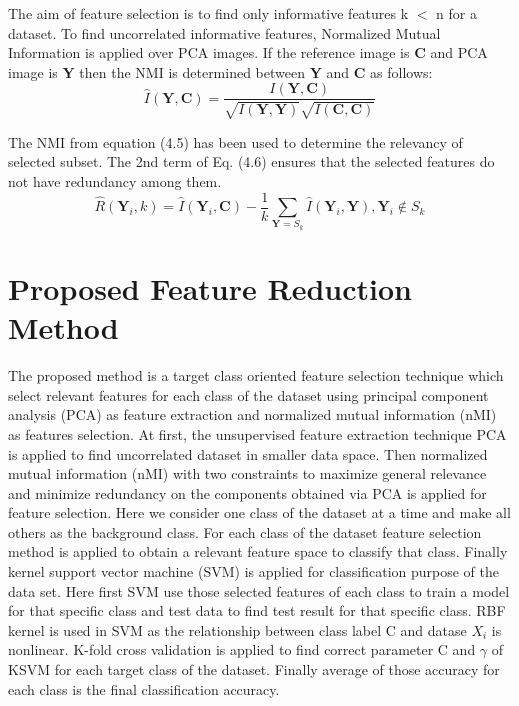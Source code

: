 \documentclass[document.tex]{subfiles}
\begin{document}
\noindent The aim of feature selection is to find only informative features
k $<$ n for a dataset. To find uncorrelated informative features, Normalized
Mutual Information is applied over PCA images. If the reference image is \textbf{C} and PCA image is \textbf{Y} then the NMI is determined between \textbf{Y} and \textbf{C} as follows:
\begin{equation}
\hat{I}(\textbf{Y},\textbf{C}) = \dfrac{I(\textbf{Y}, \textbf{C})}{\sqrt{I(\textbf{Y},\textbf{Y})}\sqrt{I( \textbf{C}, \textbf{C})}}
\end{equation}

\noindent The NMI from equation (4.5) has been used to determine the relevancy of selected subset. The 2nd term of Eq. (4.6) ensures that the selected features do not have redundancy among them. 
\begin{equation}
\hat{R}(\textbf{Y}_i,k) = \hat{I}(\textbf{Y}_i,\textbf{C}) - \dfrac{1}{k} \sum_{\textbf{Y} = S_k} \hat{I}(\textbf{Y}_i,\textbf{Y}),  \textbf{Y}_i\notin S_k
\end{equation}

\section{Proposed Feature Reduction Method}
\noindent The proposed method is a target class oriented feature selection technique which select relevant features for each class of the dataset using principal component analysis (PCA) as feature extraction\cite{7} and normalized mutual information (nMI) as features selection\cite{9}. At first, the unsupervised feature extraction technique PCA is applied to find uncorrelated dataset in smaller data space. Then normalized mutual information (nMI) with two constraints to maximize general relevance and minimize redundancy on the components obtained via PCA is applied for feature selection\cite{21}. Here we consider one class of the dataset at a time and make all others as the background class. For each class of the dataset feature selection method is applied to obtain a relevant feature space to classify that class. Finally kernel support vector machine (SVM) is applied for classification purpose of the data set\cite{11}. Here first SVM use those selected features of each class to train a model for that specific class and test data to find test result for that specific class. RBF kernel\cite{22} is used in SVM as the relationship between class label C and datase $X_i$ is nonlinear. K-fold cross validation is applied to find correct parameter C and $\gamma$ of KSVM for each target class of the dataset. Finally average of those accuracy for each class is the final classification accuracy.
\end{document}
